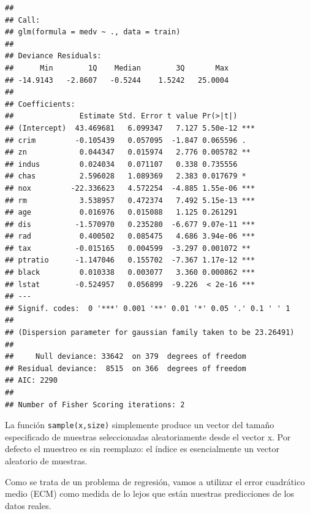 \documentclass[]{book}
\newenvironment{Shaded}{\begin{snugshade}}{\end{snugshade}}
\newcommand{\KeywordTok}[1]{\textcolor[rgb]{0.13,0.29,0.53}{\textbf{#1}}}
\newcommand{\DecValTok}[1]{\textcolor[rgb]{0.00,0.00,0.81}{#1}}
\newcommand{\StringTok}[1]{\textcolor[rgb]{0.31,0.60,0.02}{#1}}
\newcommand{\OperatorTok}[1]{\textcolor[rgb]{0.81,0.36,0.00}{\textbf{#1}}}
\newcommand{\NormalTok}[1]{#1}
\begin{document}
\begin{verbatim}
## 
## Call:
## glm(formula = medv ~ ., data = train)
## 
## Deviance Residuals: 
##      Min        1Q    Median        3Q       Max  
## -14.9143   -2.8607   -0.5244    1.5242   25.0004  
## 
## Coefficients:
##               Estimate Std. Error t value Pr(>|t|)    
## (Intercept)  43.469681   6.099347   7.127 5.50e-12 ***
## crim         -0.105439   0.057095  -1.847 0.065596 .  
## zn            0.044347   0.015974   2.776 0.005782 ** 
## indus         0.024034   0.071107   0.338 0.735556    
## chas          2.596028   1.089369   2.383 0.017679 *  
## nox         -22.336623   4.572254  -4.885 1.55e-06 ***
## rm            3.538957   0.472374   7.492 5.15e-13 ***
## age           0.016976   0.015088   1.125 0.261291    
## dis          -1.570970   0.235280  -6.677 9.07e-11 ***
## rad           0.400502   0.085475   4.686 3.94e-06 ***
## tax          -0.015165   0.004599  -3.297 0.001072 ** 
## ptratio      -1.147046   0.155702  -7.367 1.17e-12 ***
## black         0.010338   0.003077   3.360 0.000862 ***
## lstat        -0.524957   0.056899  -9.226  < 2e-16 ***
## ---
## Signif. codes:  0 '***' 0.001 '**' 0.01 '*' 0.05 '.' 0.1 ' ' 1
## 
## (Dispersion parameter for gaussian family taken to be 23.26491)
## 
##     Null deviance: 33642  on 379  degrees of freedom
## Residual deviance:  8515  on 366  degrees of freedom
## AIC: 2290
## 
## Number of Fisher Scoring iterations: 2
\end{verbatim}

\begin{Shaded}
\end{Shaded}

La función \texttt{sample(x,size)} simplemente produce un vector del
tamaño especificado de muestras seleccionadas aleatoriamente desde el
vector x. Por defecto el muestreo es sin reemplazo: el índice es
esencialmente un vector aleatorio de muestras.

Como se trata de un problema de regresión, vamos a utilizar el error
cuadrático medio (ECM) como medida de lo lejos que están nuestras
predicciones de los datos reales.
\end{document}
